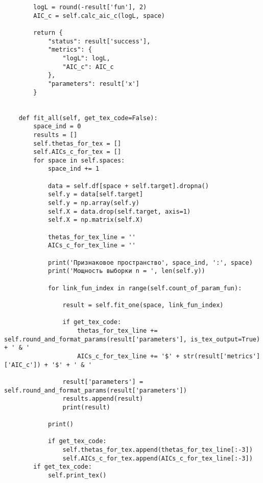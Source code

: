 \begin{verbatim}
        logL = round(-result['fun'], 2)
        AIC_c = self.calc_aic_c(logL, space)
        
        return {
            "status": result['success'],
            "metrics": {
                "logL": logL,
                "AIC_c": AIC_c
            },
            "parameters": result['x']
        }
    
    
    def fit_all(self, get_tex_code=False):
        space_ind = 0
        results = []
        self.thetas_for_tex = []
        self.AICs_c_for_tex = []
        for space in self.spaces:
            space_ind += 1
            
            data = self.df[space + self.target].dropna()
            self.y = data[self.target]
            self.y = np.array(self.y)
            self.X = data.drop(self.target, axis=1)
            self.X = np.matrix(self.X)
            
            thetas_for_tex_line = ''
            AICs_c_for_tex_line = ''
            
            print('Признаковое пространство', space_ind, ':', space)
            print('Мощность выборки n = ', len(self.y))
            
            for link_fun_index in range(self.count_of_param_fun):
            
                result = self.fit_one(space, link_fun_index)
                
                if get_tex_code:
                    thetas_for_tex_line += self.round_and_format_params(result['parameters'], is_tex_output=True) + ' & '
                    AICs_c_for_tex_line += '$' + str(result['metrics']['AIC_c']) + '$' + ' & '
                
                result['parameters'] = self.round_and_format_params(result['parameters'])
                results.append(result)
                print(result)
            
            print()
        
            if get_tex_code:
                self.thetas_for_tex.append(thetas_for_tex_line[:-3])
                self.AICs_c_for_tex.append(AICs_c_for_tex_line[:-3])
        if get_tex_code:
            self.print_tex()
\end{verbatim}



